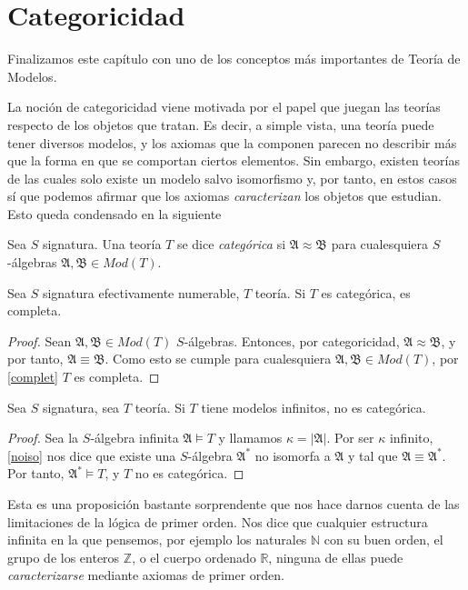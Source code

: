 \section{Categoricidad}

Finalizamos este capítulo con uno de los conceptos más importantes de Teoría de Modelos. 

La noción de categoricidad viene motivada por el papel que juegan las teorías respecto de los objetos que tratan. Es decir, a simple vista, una teoría puede tener diversos modelos, y los axiomas que la componen parecen no describir más que la forma en que se comportan ciertos elementos. Sin embargo, existen teorías de las cuales solo existe un modelo salvo isomorfismo y, por tanto, en estos casos sí que podemos afirmar que los axiomas \textit{caracterizan} los objetos que estudian. Esto queda condensado en la siguiente 

\begin{definition}
Sea $S$ signatura. Una teoría $T$ se dice \textit{categórica} si $\mathfrak{A} \approx \mathfrak{B}$ para cualesquiera $S$-álgebras $\mathfrak{A}, \mathfrak{B} \in Mod(T)$. 
\end{definition}

\begin{prop}
Sea $S$ signatura efectivamente numerable, $T$ teoría. Si $T$ es categórica, es completa.
\end{prop}
\begin{proof}
Sean $\mathfrak{A}, \mathfrak{B} \in Mod(T)$ $S$-álgebras. Entonces, por categoricidad, $\mathfrak{A} \approx \mathfrak{B}$, y por tanto, $\mathfrak{A} \equiv \mathfrak{B}$. Como esto se cumple para cualesquiera $\mathfrak{A}, \mathfrak{B} \in Mod(T)$, por \ref{complet} $T$ es completa.
\end{proof}

\begin{prop}\label{infnocat}
Sea $S$ signatura, sea $T$ teoría. Si $T$ tiene modelos infinitos, no es categórica.
\end{prop}
\begin{proof}
Sea la $S$-álgebra infinita $\mathfrak{A}\vDash T$ y llamamos $\kappa= |\mathfrak{A}|$. Por ser $\kappa$ infinito, \ref{noiso} nos dice que existe una $S$-álgebra $\mathfrak{A}^{*}$ no isomorfa a $\mathfrak{A}$ y tal que $\mathfrak{A} \equiv \mathfrak{A}^{*}$. Por tanto, $\mathfrak{A}^{*} \vDash T$, y $T$ no es categórica.
\end{proof}

Esta es una proposición bastante sorprendente que nos hace darnos cuenta de las limitaciones de la lógica de primer orden. Nos dice que cualquier estructura infinita en la que pensemos, por ejemplo los naturales $\mathbb{N}$ con su buen orden, el grupo de los enteros $\mathbb{Z}$, o el cuerpo ordenado $\mathbb{R}$, ninguna de ellas puede \textit{caracterizarse} mediante axiomas de primer orden.

